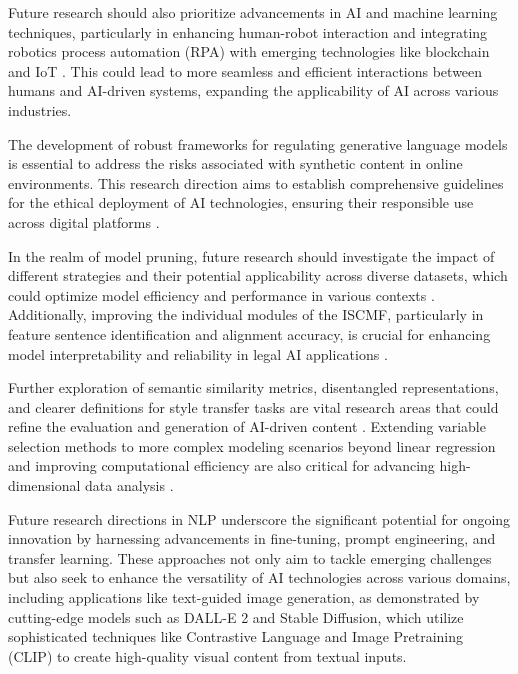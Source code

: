 Future research should also prioritize advancements in AI and machine learning techniques, particularly in enhancing human-robot interaction and integrating robotics process automation (RPA) with emerging technologies like blockchain and IoT \cite{pandy2024advancementsroboticsprocessautomation}. This could lead to more seamless and efficient interactions between humans and AI-driven systems, expanding the applicability of AI across various industries.



The development of robust frameworks for regulating generative language models is essential to address the risks associated with synthetic content in online environments. This research direction aims to establish comprehensive guidelines for the ethical deployment of AI technologies, ensuring their responsible use across digital platforms \cite{mcguffie2020radicalizationrisksgpt3advanced}.



In the realm of model pruning, future research should investigate the impact of different strategies and their potential applicability across diverse datasets, which could optimize model efficiency and performance in various contexts \cite{kaur2024cropcontextwiserobuststatic}. Additionally, improving the individual modules of the ISCMF, particularly in feature sentence identification and alignment accuracy, is crucial for enhancing model interpretability and reliability in legal AI applications \cite{lin2023interpretabilityframeworksimilarcase}.



Further exploration of semantic similarity metrics, disentangled representations, and clearer definitions for style transfer tasks are vital research areas that could refine the evaluation and generation of AI-driven content \cite{yamshchikov2020styletransferparaphraselookingsensible}. Extending variable selection methods to more complex modeling scenarios beyond linear regression and improving computational efficiency are also critical for advancing high-dimensional data analysis \cite{williams2018nonpenalizedvariableselectionhighdimensional}.



Future research directions in NLP underscore the significant potential for ongoing innovation by harnessing advancements in fine-tuning, prompt engineering, and transfer learning. These approaches not only aim to tackle emerging challenges but also seek to enhance the versatility of AI technologies across various domains, including applications like text-guided image generation, as demonstrated by cutting-edge models such as DALL-E 2 and Stable Diffusion, which utilize sophisticated techniques like Contrastive Language and Image Pretraining (CLIP) to create high-quality visual content from textual inputs. \cite{palmini2024patternscreativityuserinput,wei2022chain,pandy2024advancementsroboticsprocessautomation}













